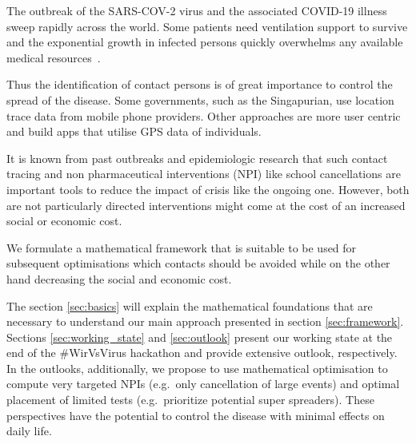 The outbreak of the SARS-COV-2 virus and the associated COVID-19 illness sweep rapidly across the world. Some patients need ventilation support to survive and the exponential growth in infected persons quickly overwhelms any available medical resources~\cite{10.1001/jama.2020.2648}.

Thus the identification of contact persons is of great importance to control the spread of the disease. Some governments, such as the Singapurian, use location trace data from mobile phone providers. Other approaches are more user centric and build apps that utilise GPS data of individuals.

It is known from past outbreaks and epidemiologic research that such contact tracing and non pharmaceutical interventions (NPI) like school cancellations are important tools to reduce the impact of crisis like the ongoing one. However, both are not particularly directed interventions might come at the cost of an increased social or economic cost.

We formulate a mathematical framework that is suitable to be used for subsequent optimisations which contacts should be avoided while on the other hand decreasing the social and economic cost.

The section \ref{sec:basics} will explain the mathematical foundations that are necessary to understand our main approach presented in section \ref{sec:framework}. Sections \ref{sec:working_state} and \ref{sec:outlook} present our working state at the end of the \#WirVsVirus hackathon and provide extensive outlook, respectively. In the outlooks, additionally, we propose to use mathematical optimisation to compute very targeted NPIs (e.g.\ only cancellation of large events) and optimal placement of limited tests (e.g.\ prioritize potential super spreaders). These perspectives have the potential to control the disease with minimal effects on daily life.